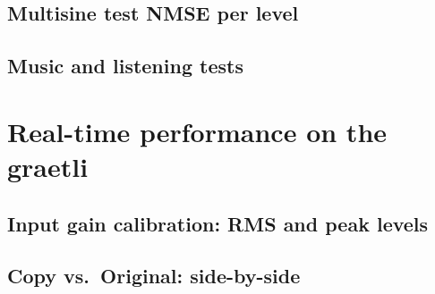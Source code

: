 \subsection{Multisine test NMSE per level}
\label{subsec:results_nmse}

\subsection{Music and listening tests}
\label{subsec:results_listening}



\section{Real-time performance on the graetli}
\label{sec:results_realtime}

\subsection{Input gain calibration: RMS and peak levels}
\label{subsec:results_input_gain}

\subsection{Copy vs.\ Original: side-by-side}
\label{sec:results_side_by_side}



